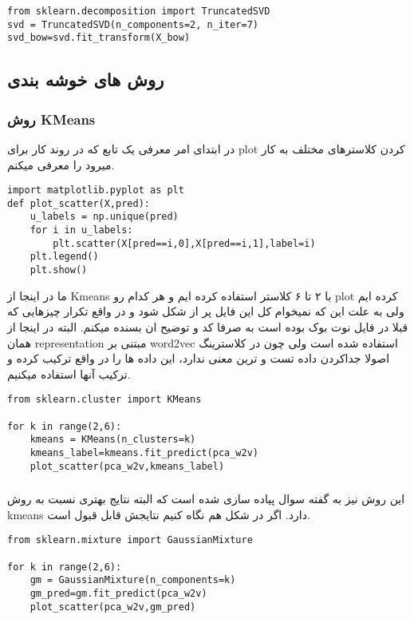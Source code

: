 \documentclass{article}[12pt]
\begin{document}
\begin{verbatim}
from sklearn.decomposition import TruncatedSVD
svd = TruncatedSVD(n_components=2, n_iter=7)
svd_bow=svd.fit_transform(X_bow)
\end{verbatim}
\subsection{روش های خوشه بندی}
\subsubsection{روش KMeans}
در ابتدای امر معرفی یک تابع که در روند کار برای plot کردن کلاسترهای مختلف به کار میرود را معرفی میکنم.  
\begin{verbatim}
import matplotlib.pyplot as plt
def plot_scatter(X,pred):
    u_labels = np.unique(pred)
    for i in u_labels:
        plt.scatter(X[pred==i,0],X[pred==i,1],label=i)
    plt.legend()
    plt.show()
\end{verbatim}


ما در اینجا از Kmeans با ۲ تا ۶ کلاستر استفاده کرده ایم و هر کدام رو plot کرده ایم ولی به علت این که نمیخوام کل این فایل پر از شکل شود و در واقع تکرار چیزهایی که قبلا در فایل نوت بوک بوده است به صرفا کد و توضیح ان بسنده میکنم. 
البته در اینجا از همان representation 
مبتنی بر word2vec استفاده شده است ولی چون در کلاسترینگ اصولا جداکردن داده تست و ترین معنی ندارد، این داده ها را در واقع ترکیب کرده و ترکیب آنها استفاده میکنیم. 
\begin{verbatim}
from sklearn.cluster import KMeans

for k in range(2,6):
    kmeans = KMeans(n_clusters=k)
    kmeans_label=kmeans.fit_predict(pca_w2v)
    plot_scatter(pca_w2v,kmeans_label)
\end{verbatim}

\subsubsection{}
این روش نیز به گفته سوال پیاده سازی شده است که البته نتایج بهتری نسبت به روش kmeans دارد. اگر در شکل هم نگاه کنیم نتایجش قابل قبول است.

\begin{verbatim}
from sklearn.mixture import GaussianMixture

for k in range(2,6):
    gm = GaussianMixture(n_components=k)
    gm_pred=gm.fit_predict(pca_w2v)
    plot_scatter(pca_w2v,gm_pred)
\end{verbatim}
\subsubsection{}
\end{document}
